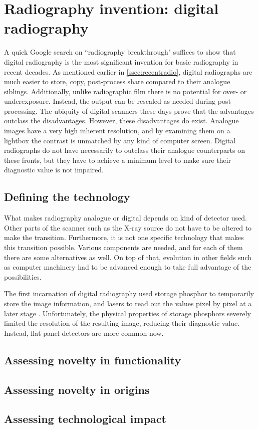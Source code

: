 \section{Radiography invention: digital radiography}
A quick Google search on ``radiography breakthrough" suffices to show that
digital radiography is the most significant invention for basic radiography in
recent decades. As mentioned earlier in \autoref{ssec:recentradio}, digital
radiographs are much easier to store, copy, post-process share compared to their
analogue siblings. Additionally, unlike radiographic film there is no potential
for over- or underexposure. Instead, the output can be rescaled as needed during
post-processing. The ubiquity of digital scanners these days prove that the
advantages outclass the disadvantages. However, these disadvantages do exist.
Analogue images have a very high inherent resolution, and by examining them on
a lightbox the contrast is unmatched by any kind of computer screen. Digital
radiographs do not have necessarily to outclass their analogue counterparts on
these fronts, but they have to achieve a minimum level to make sure
their diagnostic value is not impaired.

\subsection{Defining the technology}
What makes radiography analogue or digital depends on kind of detector used.
Other parts of the scanner such as the X-ray source do not have to be altered
to make the transition. Furthermore, it is not one specific technology that
makes this transition possible. Various components are needed, and for each
of them there are some alternatives as well. On top of that, evolution in other
fields such as computer machinery had to be advanced enough to take full
advantage of the possibilities. 

The first incarnation of digital radiography used storage phosphor to
temporarily store the image information, and lasers to read out the values pixel
by pixel at a later stage \cite{digitalradio}. Unfortunately, the physical
properties of storage phosphors severely limited the resolution of the resulting
image, reducing their diagnostic value. Instead, flat panel detectors are more common
now.



\subsection{Assessing novelty in functionality}

\subsection{Assessing novelty in origins}

\subsection{Assessing technological impact}